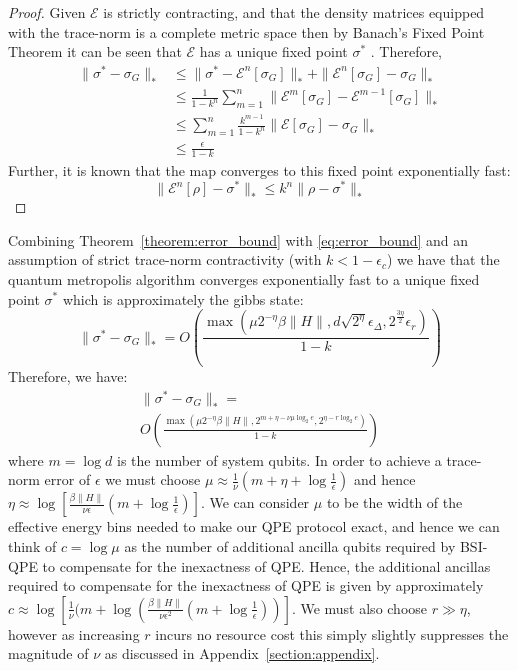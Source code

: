 \documentclass[aps,floatfix,10pt,amssymb,amsfont,amsmath,superscriptaddress,float,nofootinbib,longbibliography,nobalancelastpage,twocolumn]{revtex4-2}
\begin{document}
 \begin{proof}
     Given $\mathcal{E}$ is strictly contracting, and that the density matrices equipped with the trace-norm is a complete metric space then by Banach’s Fixed Point Theorem it can be seen that $\mathcal{E}$ has a unique fixed point $\sigma^*$ \cite{Mart_nez_Pe_a_2023,Raginsky_2002}.
Therefore,
\begin{align}
 \| \sigma^* -\sigma_G\|_* &\leq \|\sigma^*-\mathcal{E}^n[\sigma_G]\|_* +\|\mathcal{E}^n[\sigma_G] - \sigma_G\|_*\\
     &\leq \frac{1}{1-k^n}\sum_{m=1}^n \| \mathcal{E}^m[\sigma_G] - \mathcal{E}^{m-1}[\sigma_G]\|_*\\
    & \leq \sum_{m=1}^n\frac{k^{m-1}}{1-k^n} \| \mathcal{E}[\sigma_G] - \sigma_G\|_*\\
    &\leq \frac{\epsilon}{1-k}
\end{align}
Further, it is known that the map converges to this fixed point exponentially fast:
\begin{equation}
     \|\mathcal{E}^n[\rho] -\sigma^*\|_* \leq k^n\| \rho - \sigma^*\|_*
\end{equation}
 \end{proof}

Combining Theorem~\ref{theorem:error_bound} with \eqref{eq:error_bound} and an assumption of strict trace-norm contractivity (with $k < 1-\epsilon_c$) we have that the quantum metropolis algorithm converges exponentially fast to a unique fixed point $\sigma^*$ which is approximately the gibbs state:
\begin{equation}
    \|\sigma^*-\sigma_G\|_* = O\left(\frac{\max( \mu 2^{-\eta}\beta\|H\|, d \sqrt{2^{\eta}}\epsilon_{\Delta}, 2^{\frac{3\eta}{2}}\epsilon_r)}{1-k}\right)
\end{equation}
Therefore, we have:
\begin{multline}
    \|\sigma^*-\sigma_G\|_* =\\ O\left(\frac{\max( \mu 2^{-\eta}\beta\|H\|, 2^{m+\eta-\nu\mu \log_2 e}, 2^{\eta-r\log_2e})}{1-k}\right)
\end{multline}
where $m = \log d$ is the number of system qubits.
In order to achieve a trace-norm error of $\epsilon$ we must choose $\mu \approx \frac{1}{\nu}(m+\eta+\log \frac{1}{\epsilon})$ and hence $\eta \approx \log \left[\frac{\beta \|H\|}{\nu\epsilon}(m + \log\frac{1}{\epsilon})\right]$. We can consider $\mu$ to be the width of the effective energy bins needed to make our QPE protocol exact, and hence we can think of $c = \log \mu$ as the number of additional ancilla qubits required by BSI-QPE to compensate for the inexactness of QPE. Hence, the additional ancillas required to compensate for the inexactness of QPE is given by approximately $c \approx \log \left[\frac{1}{\nu}(m + \log \left(\frac{\beta \|H\|}{\nu\epsilon^2}(m + \log\frac{1}{\epsilon})\right)\right]$. We must also choose $r \gg \eta$, however as increasing $r$ incurs no resource cost this simply slightly suppresses the magnitude of $\nu$ as discussed in Appendix~\ref{section:appendix}.
\end{document}
